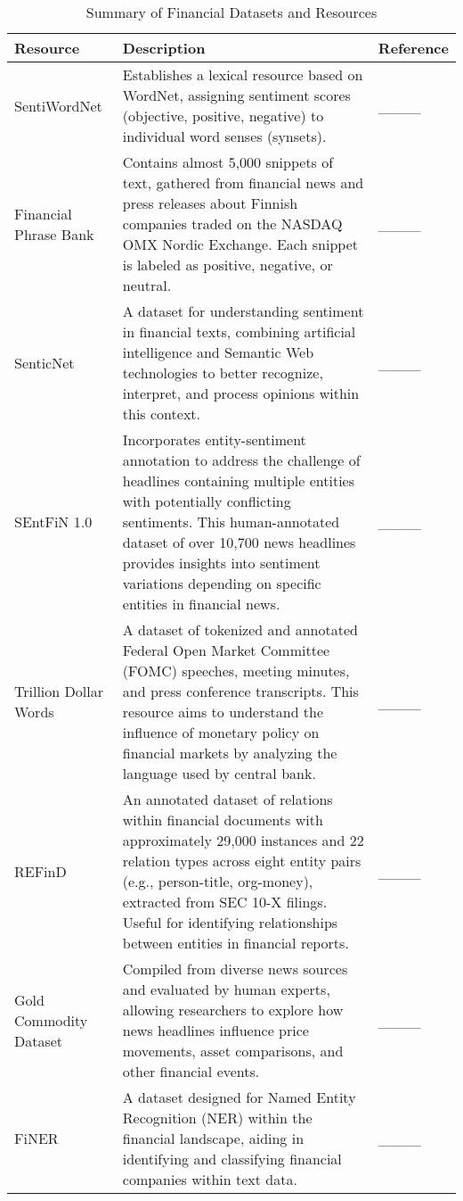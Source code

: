 \begin{table}[!h]
\footnotesize
    \centering
    \caption{Summary of Financial Datasets and Resources}
    \begin{tabular}{|p{}|p{}|p{}|}
        \hline
        \textbf{Resource} & \textbf{Description} & \textbf{Reference} \\ \hline
        SentiWordNet & Establishes a lexical resource based on WordNet, assigning sentiment scores (objective, positive, negative) to individual word senses (synsets). & ____ \\ \hline
        Financial Phrase Bank & Contains almost 5,000 snippets of text, gathered from financial news and press releases about Finnish companies traded on the NASDAQ OMX Nordic Exchange. Each snippet is labeled as positive, negative, or neutral. & ____ \\ \hline
        SenticNet & A dataset for understanding sentiment in financial texts, combining artificial intelligence and Semantic Web technologies to better recognize, interpret, and process opinions within this context. & ____ \\ \hline
        SEntFiN 1.0 & Incorporates entity-sentiment annotation to address the challenge of headlines containing multiple entities with potentially conflicting sentiments. This human-annotated dataset of over 10,700 news headlines provides insights into sentiment variations depending on specific entities in financial news. & ____ \\ \hline
        Trillion Dollar Words & A dataset of tokenized and annotated Federal Open Market Committee (FOMC) speeches, meeting minutes, and press conference transcripts. This resource aims to understand the influence of monetary policy on financial markets by analyzing the language used by central bank. & ____ \\ \hline
        REFinD & An annotated dataset of relations within financial documents with approximately 29,000 instances and 22 relation types across eight entity pairs (e.g., person-title, org-money), extracted from SEC 10-X filings. Useful for identifying relationships between entities in financial reports. & ____ \\ \hline
        Gold Commodity Dataset & Compiled from diverse news sources and evaluated by human experts, allowing researchers to explore how news headlines influence price movements, asset comparisons, and other financial events. & ____ \\ \hline
        FiNER & A dataset designed for Named Entity Recognition (NER) within the financial landscape, aiding in identifying and classifying financial companies within text data. & ____ \\ \hline

\end{tabular}
\end{table}
